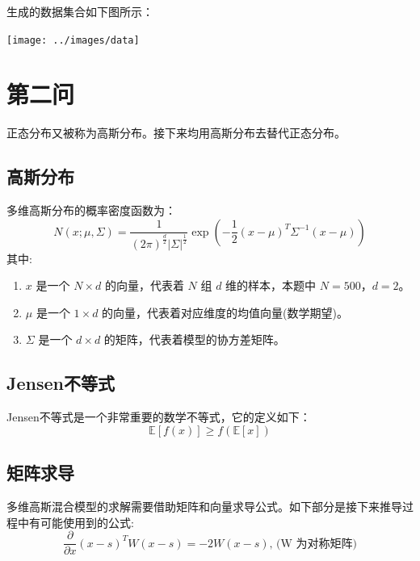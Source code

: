 \documentclass[UTF8]{article} %
\begin{document}
    生成的数据集合如下图所示：

    \begin{minipage}[t]{0.5\linewidth}
        \centering
        \texttt{[image: ../images/data]}
    \end{minipage}


    \section{第二问}
    正态分布又被称为高斯分布。接下来均用高斯分布去替代正态分布。

    \subsection{高斯分布}
    多维高斯分布的概率密度函数为：
    \begin{equation}
        N(x;\mu, \Sigma) = \frac{1}{(2\pi)^{\frac{d}{2}}|\Sigma|^{\frac{1}{2}}}\exp\left(-\frac{1}{2}(x-\mu)^T\Sigma^{-1}(x-\mu)\right) \label{eq:gaussian}
    \end{equation}
    其中:
    \begin{enumerate}
        \item $x$ 是一个 $N \times d$ 的向量，代表着 $N$ 组 $d$ 维的样本，本题中 $N=500$，$d=2$。
        \item $\mu$ 是一个 $1 \times d$ 的向量，代表着对应维度的均值向量(数学期望)。
        \item $\Sigma$ 是一个 $d \times d$ 的矩阵，代表着模型的协方差矩阵。
    \end{enumerate}

    \subsection{Jensen不等式}
    Jensen不等式是一个非常重要的数学不等式，它的定义如下：
    \begin{equation}
        \mathbb{E}[f(x)] \geq f(\mathbb{E}[x]) \label{eq:jensen}
    \end{equation}

    \subsection{矩阵求导}
    多维高斯混合模型的求解需要借助矩阵和向量求导公式。如下部分是接下来推导过程中有可能使用到的公式:
    \begin{equation}
        \frac{\partial}{\partial x} (x-s)^T W (x-s) = -2W(x-s) \text{, (W 为对称矩阵)} \label{eq:matrix_derivation}
    \end{equation}
\end{document}
